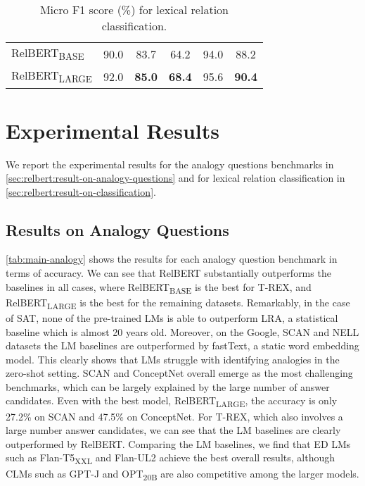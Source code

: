 \documentclass[3p]{elsarticle}
\begin{document}
{\begin{table}[!t]
\begin{tabular}{llccccc}
\midrule
\multicolumn{2}{l}{RelBERT\textsubscript{BASE}}  & 90.0  & 83.7     & {64.2}      & 94.0   & {88.2}   \\
\multicolumn{2}{l}{RelBERT\textsubscript{LARGE}} & 92.0  & \textbf{85.0}     & \textbf{68.4}      & 95.6   & \textbf{90.4}   \\
\bottomrule
\end{tabular}
\caption{Micro F1 score (\%) for lexical relation classification.}
\label{tab:main-classification}
\end{table}


\section{Experimental Results} \label{sec:relbert:experimental-results}
We report the experimental results for the analogy questions benchmarks in \autoref{sec:relbert:result-on-analogy-questions} and for lexical relation classification in \autoref{sec:relbert:result-on-classification}.

\subsection{Results on Analogy Questions}\label{sec:relbert:result-on-analogy-questions}

\autoref{tab:main-analogy} shows the results for each analogy question benchmark in terms of accuracy. We can see that RelBERT substantially outperforms the baselines in all cases, where RelBERT\textsubscript{BASE} is the best for T-REX, and RelBERT\textsubscript{LARGE} is the best for the remaining datasets.
Remarkably, in the case of SAT, none of the pre-trained LMs is able to outperform LRA, a statistical baseline which is almost 20 years old. Moreover, on the Google, SCAN and NELL datasets the LM baselines are outperformed by fastText, a static word embedding model. This clearly shows that LMs struggle with identifying analogies in the zero-shot setting. SCAN and ConceptNet overall emerge as the most challenging benchmarks, which can be largely explained by the large number of answer candidates. Even with the best model, RelBERT\textsubscript{LARGE}, the accuracy is only 27.2\% on SCAN and 47.5\% on ConceptNet. For T-REX, which also involves a large number answer candidates, we can see that the LM baselines are clearly outperformed by RelBERT. Comparing the LM baselines, we find that ED LMs such as Flan-T5\textsubscript{XXL} and Flan-UL2 achieve the best overall results, although CLMs such as GPT-J and OPT\textsubscript{20B} are also competitive among the larger models.

}
\end{document}
